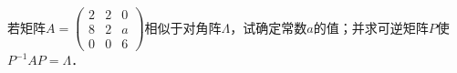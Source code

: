\documentclass[plain,noanswer,medmath]{../../template/jnuexam}
\begin{document}

\begin{problem}
若矩阵$A = \begin{pmatrix}
  2 & 2 & 0 \\
  8 & 2 & a \\
  0 & 0 & 6
\end{pmatrix}$相似于对角阵$\Lambda$，试确定常数$a$的值；并求可逆矩阵$P$使$P^{-1}AP=\Lambda$．
\end{problem}



\end{document}
